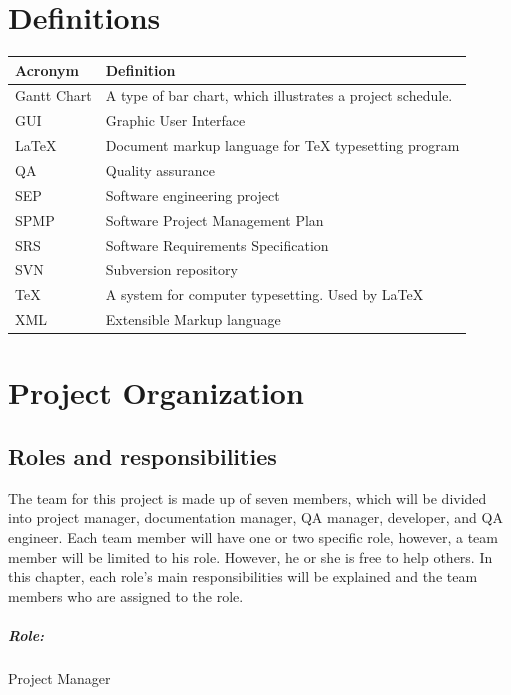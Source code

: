 \documentclass[11pt, a4paper]{report}
\begin{document}
\pagebreak


\chapter{Definitions}
\begin{tabular}{| l | l | }
\hline
Acronym      		&	Definition       											\\ \hline
Gantt Chart      	& 	A type of bar chart, which illustrates a project schedule.	\\ \hline
GUI					& 	Graphic User Interface 										\\ \hline
{\LaTeX}			&	Document markup language for {\TeX} typesetting program 	\\ \hline
QA 					&	Quality assurance 											\\ \hline
SEP					&	Software engineering project								\\ \hline
SPMP				&	Software Project Management Plan							\\ \hline
SRS					&	Software Requirements Specification							\\ \hline
SVN					&	Subversion repository										\\ \hline
{\TeX} 				&	A system for computer typesetting. Used by {\LaTeX}			\\ \hline
XML					& 	Extensible Markup language 									\\ \hline
\end{tabular}

\pagebreak


\chapter{Project Organization}

\section{Roles and responsibilities}
The team for this project is made up of seven members, which will be divided into project manager, documentation manager, QA manager, developer, and QA engineer. Each team member will have one or two specific role, however, a team member will be limited to his role. However, he or she is free to help others. In this chapter, each role's main responsibilities will be explained and the team members who are assigned to the role.

\paragraph{Role: } Project Manager
\end{document}
